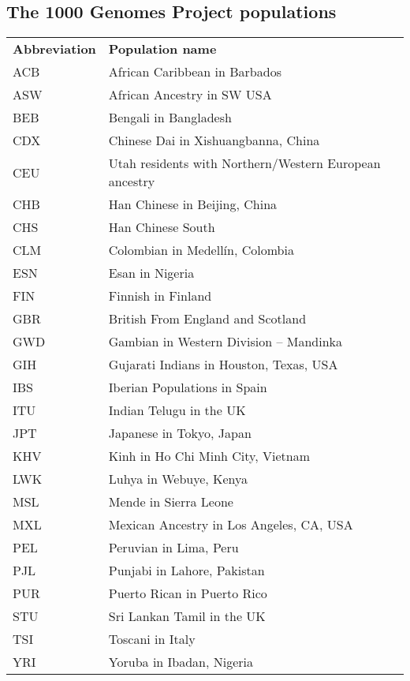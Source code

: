 \begin{table}[!h]
\begin{tabular}{l l r}
\end{tabular}
\end{table}

\newpage
\subsection*{The 1000 Genomes Project populations}

\begin{table}[!h]
\hspace{1.0cm}
\begin{tabular}{l l r}

\textbf{Abbreviation} & \textbf{Population name}\\ [1ex]
\textsc{ACB} & African Caribbean in Barbados\\ [1ex]
\textsc{ASW} & African Ancestry in SW USA \\ [1ex]
\textsc{BEB} & Bengali in Bangladesh\\ [1ex]
\textsc{CDX} & Chinese Dai in Xishuangbanna, China\\ [1ex]
\textsc{CEU} & Utah residents with Northern/Western European ancestry\\ [1ex]
\textsc{CHB} & Han Chinese in Beijing, China\\ [1ex]
\textsc{CHS} & Han Chinese South\\ [1ex]
\textsc{CLM} & Colombian in Medell\'{i}n, Colombia\\ [1ex]
\textsc{ESN} & Esan in Nigeria\\ [1ex]
\textsc{FIN} & Finnish in Finland\\ [1ex]
\textsc{GBR} & British From England and Scotland\\ [1ex]
\textsc{GWD} & Gambian in Western Division -- Mandinka\\ [1ex]
\textsc{GIH} & Gujarati Indians in Houston, Texas, USA\\ [1ex]
\textsc{IBS} & Iberian Populations in Spain\\ [1ex]
\textsc{ITU} & Indian Telugu in the UK\\ [1ex]
\textsc{JPT} & Japanese in Tokyo, Japan\\ [1ex]
\textsc{KHV} & Kinh in Ho Chi Minh City, Vietnam\\ [1ex]
\textsc{LWK} & Luhya in Webuye, Kenya\\ [1ex]
\textsc{MSL} & Mende in Sierra Leone\\ [1ex]
\textsc{MXL} & Mexican Ancestry in Los Angeles, CA, USA\\ [1ex]
\textsc{PEL} & Peruvian in Lima, Peru\\ [1ex]
\textsc{PJL} & Punjabi in Lahore, Pakistan\\ [1ex]
\textsc{PUR} & Puerto Rican in Puerto Rico\\ [1ex]
\textsc{STU} & Sri Lankan Tamil in the UK\\ [1ex]
\textsc{TSI} & Toscani in Italy\\ [1ex]
\textsc{YRI} & Yoruba in Ibadan, Nigeria\\ [1ex]

\end{tabular}
\end{table}

\normalsize






